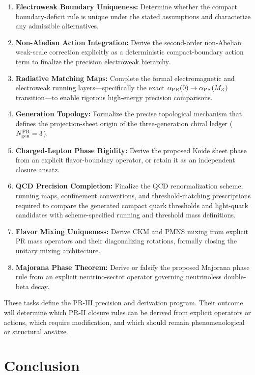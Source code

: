 \documentclass[11pt]{article}
\begin{document}
\begin{enumerate}
    \item \textbf{Electroweak Boundary Uniqueness:} Determine whether the compact boundary-deficit rule is unique under the stated assumptions and characterize any admissible alternatives.
    \item \textbf{Non-Abelian Action Integration:} Derive the second-order non-Abelian weak-scale correction explicitly as a deterministic compact-boundary action term to finalize the precision electroweak hierarchy.
    \item \textbf{Radiative Matching Maps:} Complete the formal electromagnetic and electroweak running layers—specifically the exact \(\alpha_{\rm PR}(0)\rightarrow\alpha_{\rm PR}(M_Z)\) transition—to enable rigorous high-energy precision comparisons.
    \item \textbf{Generation Topology:} Formalize the precise topological mechanism that defines the projection-sheet origin of the three-generation chiral ledger (\(N_{\rm gen}^{\rm PR}=3\)).
    \item \textbf{Charged-Lepton Phase Rigidity:} Derive the proposed Koide sheet phase from an explicit flavor-boundary operator, or retain it as an independent closure ansatz.
    \item \textbf{QCD Precision Completion:} Finalize the QCD renormalization scheme, running maps, confinement conventions, and threshold-matching prescriptions required to compare the generated compact quark thresholds and light-quark candidates with scheme-specified running and threshold mass definitions.
    \item \textbf{Flavor Mixing Uniqueness:} Derive CKM and PMNS mixing from explicit PR mass operators and their diagonalizing rotations, formally closing the unitary mixing architecture.
    \item \textbf{Majorana Phase Theorem:} Derive or falsify the proposed Majorana phase rule from an explicit neutrino-sector operator governing neutrinoless double-beta decay.
\end{enumerate}

These tasks define the PR-III precision and derivation program. Their outcome will determine which PR-II closure rules can be derived from explicit operators or actions, which require modification, and which should remain phenomenological or structural ansätze.

\section{Conclusion}
\label{sec:pr2_conclusion}
\end{document}
